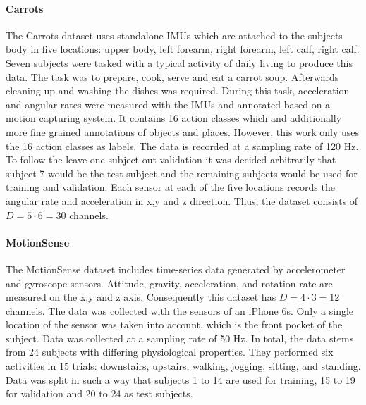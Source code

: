 \documentclass[11pt,titlepage,oneside,openany]{book}
\begin{document}
\paragraph{Carrots}
The Carrots dataset uses standalone IMUs which are attached to the subjects body in five locations: upper body, left forearm, right forearm, left calf, right calf. Seven subjects were tasked with a typical activity of daily living to produce this data.
The task was to prepare, cook, serve and eat a carrot soup. Afterwards cleaning up and washing the dishes was required. During this task, acceleration and angular rates were measured with the IMUs and annotated based on a motion capturing system.
It contains 16 action classes which and additionally more fine grained annotations of objects and places. However, this work only uses the 16 action classes as labels. The data is recorded at a sampling rate of 120 Hz. To follow the leave one-subject out validation it was decided arbitrarily that subject 7 would be the test subject and the remaining subjects would be used for training and validation. Each sensor at each of the five locations records the angular rate and acceleration in x,y and z direction. Thus, the dataset consists of $D = 5 \cdot 6 = 30$ channels.

\paragraph{MotionSense}
The MotionSense dataset includes time-series data generated by accelerometer and gyroscope sensors. Attitude, gravity, acceleration, and rotation rate are measured on the x,y and z axis. Consequently this dataset has $D = 4 \cdot 3 = 12$ channels. The data was collected with the sensors of an iPhone 6s. Only a single location of the sensor was taken into account, which is the front pocket of the subject. Data was collected at a sampling rate of 50 Hz. In total, the data stems from 24 subjects with differing physiological properties. They performed six activities in 15 trials: downstairs, upstairs, walking, jogging, sitting, and standing. Data was split in such a way that subjects 1 to 14 are used for training, 15 to 19 for validation and  20 to 24 as test subjects.
\end{document}

